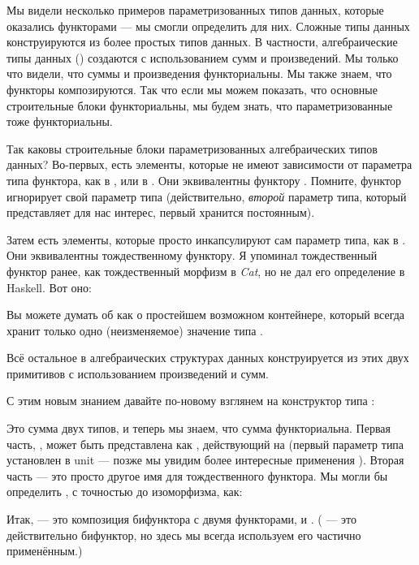 Мы видели несколько примеров параметризованных типов данных, которые оказались
функторами --- мы смогли определить  для них.
Сложные типы данных конструируются из более простых типов данных. В
частности, алгебраические типы данных () создаются с использованием сумм и
произведений. Мы только что видели, что суммы и произведения функториальны. Мы
также знаем, что функторы композируются. Так что если мы можем показать, что основные
строительные блоки  функториальны, мы будем знать, что параметризованные
 тоже функториальны.

Так каковы строительные блоки параметризованных алгебраических типов данных?
Во-первых, есть элементы, которые не имеют зависимости от параметра типа
функтора, как  в , или 
в . Они эквивалентны функтору .
Помните, функтор  игнорирует свой параметр типа (действительно,
\emph{второй} параметр типа, который представляет для нас интерес,
первый хранится постоянным).

Затем есть элементы, которые просто инкапсулируют сам параметр типа,
как  в . Они эквивалентны
тождественному функтору. Я упоминал тождественный функтор ранее, как
тождественный морфизм в \emph{Cat}, но не дал его определение в
Haskell. Вот оно:


Вы можете думать об  как о простейшем возможном контейнере,
который всегда хранит только одно (неизменяемое) значение типа .

Всё остальное в алгебраических структурах данных конструируется из этих
двух примитивов с использованием произведений и сумм.

С этим новым знанием давайте по-новому взглянем на конструктор типа :

Это сумма двух типов, и теперь мы знаем, что сумма функториальна.
Первая часть, , может быть представлена как ,
действующий на  (первый параметр типа  установлен
в unit --- позже мы увидим более интересные применения ).
Вторая часть --- это просто другое имя для тождественного функтора. Мы
могли бы определить , с точностью до изоморфизма, как:

Итак,  --- это композиция бифунктора 
с двумя функторами,  и .
( --- это действительно бифунктор, но здесь мы всегда используем его
частично применённым.)

